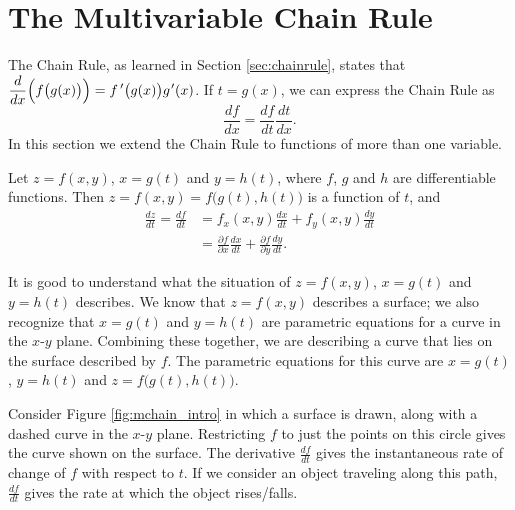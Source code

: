 \section{The Multivariable Chain Rule}\label{sec:multi_chain}
The Chain Rule, as learned in Section \ref{sec:chainrule}, states that $\displaystyle \frac{d}{dx}\Big(f\big(g(x)\big)\Big) = f\,'\big(g(x)\big)g\hskip.75pt'(x)$. If $t=g(x)$, we can express the Chain Rule as 
$$\frac{df}{dx} = \frac{df}{dt}\frac{dt}{dx}.$$
In this section we extend the Chain Rule to functions of more than one variable.

{Let $z=f(x,y)$, $x=g(t)$ and $y=h(t)$, where $f$, $g$ and $h$ are differentiable functions. Then $z = f(x,y) = f\big(g(t),h(t)\big)$ is a function of $t$, and 
\begin{align*}
\frac{dz}{dt} = \frac{df}{dt} &= f_x(x,y)\frac{dx}{dt}+f_y(x,y)\frac{dy}{dt}\\[5pt]
		&= \frac{\partial f}{\partial x}\frac{dx}{dt}+\frac{\partial f}{\partial y}\frac{dy}{dt}.
\end{align*}
}

It is good to understand what the situation of $z=f(x,y)$, $x=g(t)$ and $y=h(t)$ describes. We know that $z=f(x,y)$ describes a surface; we also recognize that $x=g(t)$ and $y=h(t)$ are parametric equations for a curve in the $x$-$y$ plane. Combining these together, we are describing a curve that lies on the surface described by $f$. The parametric equations for this curve are $x=g(t)$, $y=h(t)$ and $z=f\big(g(t),h(t)\big)$.

Consider Figure \ref{fig:mchain_intro} in which a surface is drawn, along with a dashed curve in the $x$-$y$ plane. Restricting $f$ to just the points on this circle gives the curve shown on the surface. The derivative $\frac{df}{dt}$ gives the instantaneous rate of change of $f$ with respect to $t$. If we consider an object traveling along this path, $\frac{df}{dt}$ gives the rate at which the object rises/falls.


